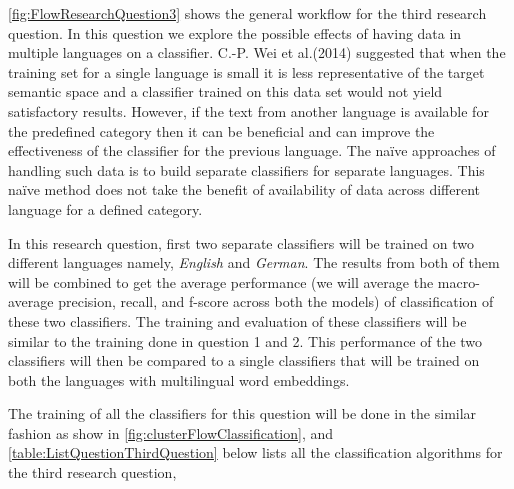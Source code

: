 \ref{fig:FlowResearchQuestion3} shows the general workflow for the third research question. In this question we explore the possible effects of having data in multiple languages on a classifier. C.-P. Wei et al.(2014)\cite{Wei:2014:EPD:2566999.2567111} suggested that when the training set for a single language is small it is less representative of the target semantic space and a classifier trained on this data set would not yield satisfactory results. However, if the text from another language is available for the predefined category then it can be beneficial and can improve the effectiveness of the classifier for the previous language. The naïve approaches of handling such data is to build separate classifiers for separate languages. This naïve method does not take the benefit of availability of data across different language for a defined category. 

In this research question, first two separate classifiers will be trained on two different languages namely, \textit{English} and \textit{German}. The results from both of them will be combined to get the average performance (we will average the macro-average precision, recall, and f-score across both the models) of classification of these two classifiers. The training and evaluation of these classifiers will be similar to the training done in question 1 and 2. This performance of the two classifiers will then be compared to a single classifiers that will be trained on both the languages with multilingual word embeddings.

The training of all the classifiers for this question will be done in the similar fashion as show in \ref{fig:clusterFlowClassification}, and \ref{table:ListQuestionThirdQuestion} below lists all the classification algorithms for the third research question,


